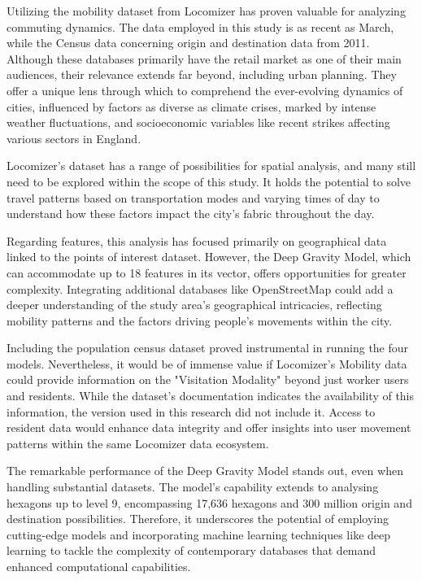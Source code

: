         Utilizing the mobility dataset from Locomizer has proven valuable for analyzing commuting dynamics. The data employed in this study is as recent as March, while the Census data concerning origin and destination data from 2011. Although these databases primarily have the retail market as one of their main audiences, their relevance extends far beyond, including urban planning. They offer a unique lens through which to comprehend the ever-evolving dynamics of cities, influenced by factors as diverse as climate crises, marked by intense weather fluctuations, and socioeconomic variables like recent strikes affecting various sectors in England.

        Locomizer's dataset has a range of possibilities for spatial analysis, and many still need to be explored within the scope of this study. It holds the potential to solve travel patterns based on transportation modes and varying times of day to understand how these factors impact the city's fabric throughout the day.
        
        Regarding features, this analysis has focused primarily on geographical data linked to the points of interest dataset. However, the Deep Gravity Model, which can accommodate up to 18 features in its vector, offers opportunities for greater complexity. Integrating additional databases like OpenStreetMap could add a deeper understanding of the study area's geographical intricacies, reflecting mobility patterns and the factors driving people's movements within the city.
        
        Including the population census dataset proved instrumental in running the four models. Nevertheless, it would be of immense value if Locomizer's Mobility data could provide information on the "Visitation Modality" beyond just worker users and residents. While the dataset's documentation indicates the availability of this information, the version used in this research did not include it. Access to resident data would enhance data integrity and offer insights into user movement patterns within the same Locomizer data ecosystem.
        
        The remarkable performance of the Deep Gravity Model stands out, even when handling substantial datasets. The model's capability extends to analysing hexagons up to level 9, encompassing 17,636 hexagons and 300 million origin and destination possibilities. Therefore, it underscores the potential of employing cutting-edge models and incorporating machine learning techniques like deep learning to tackle the complexity of contemporary databases that demand enhanced computational capabilities.
        
